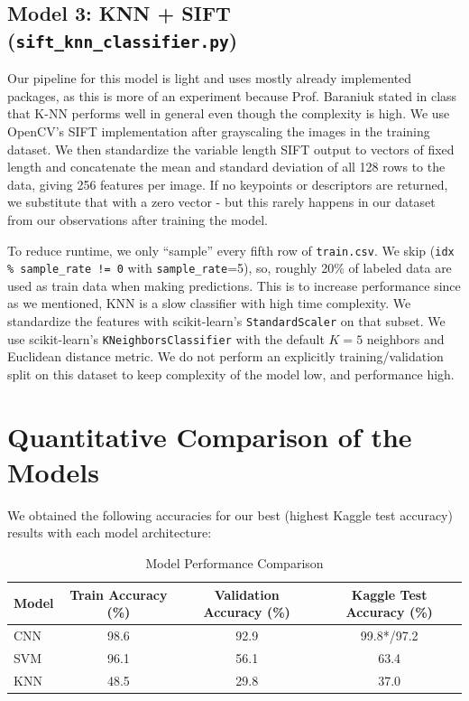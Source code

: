 \documentclass[10pt]{article} %
\begin{document}
\subsection{Model 3: KNN + SIFT (\texttt{sift\_knn\_classifier.py})}
Our pipeline for this model is light and uses mostly already implemented packages, as this is more of an experiment because Prof. Baraniuk stated in class that K-NN performs well in general even though the complexity is high. We use OpenCV's SIFT implementation after grayscaling the images in the training dataset. We then standardize the variable length SIFT output to vectors of fixed length and concatenate the mean and standard deviation of all 128 rows to the data, giving 256 features per image. If no keypoints or descriptors are returned, we substitute that with a zero vector - but this rarely happens in our dataset from our observations after training the model.

To reduce runtime, we only ``sample'' every fifth row of \texttt{train.csv}. We skip (\texttt{idx \% sample\_rate != 0} with \texttt{sample\_rate}=5), so, roughly 20\% of labeled data are used as train data when making predictions. This is to increase performance since as we mentioned, KNN is a slow classifier with high time complexity. We standardize the features with scikit-learn's \texttt{StandardScaler} on that subset. We use scikit-learn's \texttt{KNeighborsClassifier} with the default $K=5$ neighbors and Euclidean distance metric. We do not perform an explicitly training/validation split on this dataset to keep complexity of the model low, and performance high.

\section{Quantitative Comparison of the Models}
We obtained the following accuracies for our best (highest Kaggle test accuracy) results with each model architecture:
\begin{table}[h]
  \centering
  \caption{Model Performance Comparison}
  \label{tab:model_results}
  \begin{tabular}{lccc}
    \toprule
    \textbf{Model} & \textbf{Train Accuracy (\%)} & \textbf{Validation Accuracy (\%)} & \textbf{Kaggle Test Accuracy (\%)} \\
    \midrule
    CNN & 98.6 & 92.9 & 99.8*/97.2 \\
    SVM & 96.1 & 56.1 & 63.4 \\
    KNN & 48.5 & 29.8 & 37.0 \\
    \bottomrule
  \end{tabular}
\end{table}
\end{document}
